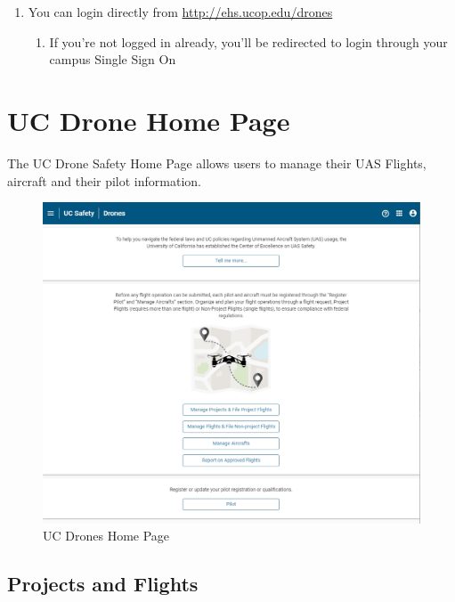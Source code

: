 \documentclass[
]{book}
\providecommand{\tightlist}{%
  \setlength{\itemsep}{0pt}\setlength{\parskip}{0pt}}
\begin{document}
\begin{enumerate}
\def\labelenumi{\arabic{enumi}.}
\setcounter{enumi}{1}
\item
  You can login directly from \url{http://ehs.ucop.edu/drones}

  \begin{enumerate}
  \def\labelenumii{\arabic{enumii}.}
  \tightlist
  \item
    If you're not logged in already, you'll be redirected to login through your campus Single Sign On
  \end{enumerate}
\end{enumerate}

\hypertarget{ch-UCDrones-home}{%
\chapter{UC Drone Home Page}\label{ch-UCDrones-home}}

The UC Drone Safety Home Page allows users to manage their UAS Flights, aircraft and their pilot information.

\begin{figure}

{\centering \includegraphics[width=0.85\linewidth]{images/UCDrones_Home} 

}

\caption{UC Drones Home Page}\label{fig:UCDrones-home}
\end{figure}

\hypertarget{projects-and-flights}{%
\section{Projects and Flights}\label{projects-and-flights}}
\end{document}
